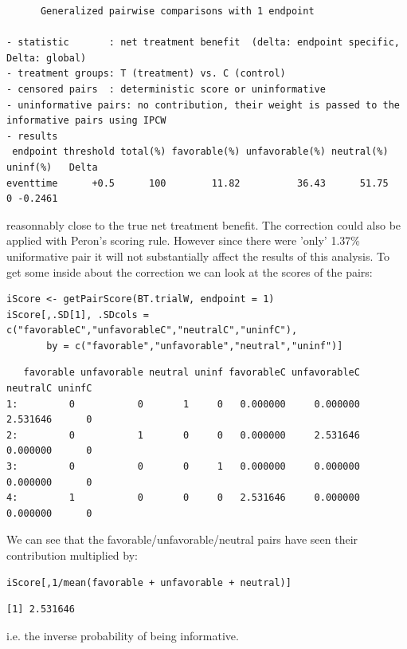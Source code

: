 \documentclass[12pt]{article}
\begin{document}
\begin{verbatim}
      Generalized pairwise comparisons with 1 endpoint

- statistic       : net treatment benefit  (delta: endpoint specific, Delta: global) 
- treatment groups: T (treatment) vs. C (control) 
- censored pairs  : deterministic score or uninformative
- uninformative pairs: no contribution, their weight is passed to the informative pairs using IPCW
- results
 endpoint threshold total(%) favorable(%) unfavorable(%) neutral(%) uninf(%)   Delta
eventtime      +0.5      100        11.82          36.43      51.75        0 -0.2461
\end{verbatim}


reasonnably close to the true net treatment benefit. The correction
could also be applied with Peron's scoring rule. However since there
were 'only' 1.37\% uniformative pair it will not substantially affect
the results of this analysis. To get some inside about the correction
we can look at the scores of the pairs:
\lstset{language=r,label= ,caption= ,captionpos=b,numbers=none}
\begin{lstlisting}
iScore <- getPairScore(BT.trialW, endpoint = 1)
iScore[,.SD[1], .SDcols = c("favorableC","unfavorableC","neutralC","uninfC"),
       by = c("favorable","unfavorable","neutral","uninf")]
\end{lstlisting}

\begin{verbatim}
   favorable unfavorable neutral uninf favorableC unfavorableC neutralC uninfC
1:         0           0       1     0   0.000000     0.000000 2.531646      0
2:         0           1       0     0   0.000000     2.531646 0.000000      0
3:         0           0       0     1   0.000000     0.000000 0.000000      0
4:         1           0       0     0   2.531646     0.000000 0.000000      0
\end{verbatim}


We can see that the favorable/unfavorable/neutral pairs have seen
their contribution multiplied by:
\lstset{language=r,label= ,caption= ,captionpos=b,numbers=none}
\begin{lstlisting}
iScore[,1/mean(favorable + unfavorable + neutral)]
\end{lstlisting}

\begin{verbatim}
[1] 2.531646
\end{verbatim}


i.e. the inverse probability of being informative. 
\end{document}
